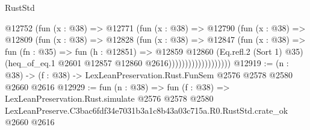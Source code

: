 \begin{lexlean}{RustStd}
\begin{coremodule}
                          @12752
                            (fun (x : @38) =>
                            @12771
                              (fun (x : @38) =>
                              @12790
                                (fun (x : @38) =>
                                @12809
                                  (fun (x : @38) =>
                                  @12828
                                    (fun (x : @38) =>
                                    @12847
                                      (fun (x : @38) =>
                                      fun (fn : @35) =>
                                      fun (h : @12851) =>
                                      @12859
                                        @12860
                                        (Eq.refl.{2} (Sort 1) @35)
                                        (heq_of_eq.{1} @2601 @12857 @12860 @2616)))))))))))))))))))
@12919 := (n : @38) -> (f : @38) -> LexLeanPreservation.Rust.FunSem @2576 @2578 @2580 @2660 @2616
@12929 := fun (n : @38) =>
  fun (f : @38) =>
  LexLeanPreservation.Rust.simulate
    @2576
    @2578
    @2580
    LexLeanPreserve.C3bac6fdf34e7031b3a1c8b43a03c715a.R0.RustStd.crate_ok
    @2660
    @2616
\end{coremodule}
\end{lexlean}
